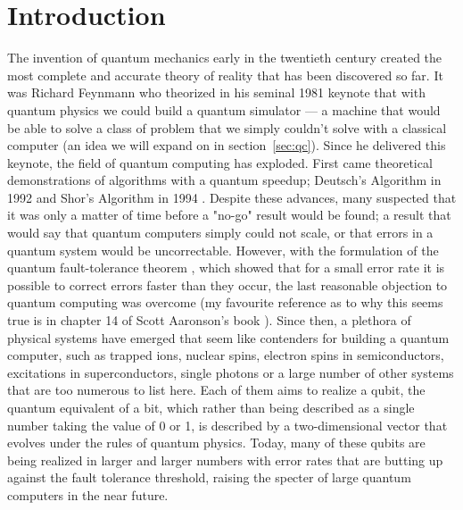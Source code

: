 \chapter{Introduction}

The invention of quantum mechanics early in the twentieth century created the most complete and accurate
theory of reality that has been discovered so far. It was Richard Feynmann who theorized in his 
seminal 1981 keynote \cite{Feynman1982} that with quantum physics we could build a quantum simulator --- 
a machine that would be able to solve a class of problem that we simply couldn't solve with a
classical computer (an idea we will expand on in section~\ref{sec:qc}). Since he delivered this keynote, the
field of quantum computing has exploded. First came theoretical demonstrations of algorithms
with a quantum speedup; Deutsch's Algorithm in 1992 \cite{Deutsch} and Shor's Algorithm in 1994 \cite{Shor}. 
Despite these advances, many suspected that it was only a matter of time before a "no-go" result would
be found; a result that would say that quantum computers simply could not scale, or that errors in a 
quantum system would be uncorrectable.
However, with the formulation of the quantum fault-tolerance theorem \cite{1996quant.ph.11025A}, which
showed that for a small error rate it is possible to correct errors faster than they occur, the last
reasonable objection to quantum computing was overcome (my favourite reference as to why this seems true
is in chapter 14 of Scott Aaronson's book \cite{Aaronson:skepticism}). Since then, a plethora of physical
systems have emerged that seem like contenders for building a quantum computer, such as trapped 
ions, nuclear spins, electron spins in semiconductors, excitations in superconductors, single photons
or a large number of other systems that are too numerous to list here. Each of them aims to realize a qubit,
the quantum equivalent of a bit, which rather than being described as a single number taking the value of
0 or 1, is described by a two-dimensional vector that evolves under the rules of quantum physics. Today,
many of these qubits are being realized in larger and larger numbers with error rates that are butting up 
against the fault tolerance threshold, raising the specter of large quantum computers in the near future. 

